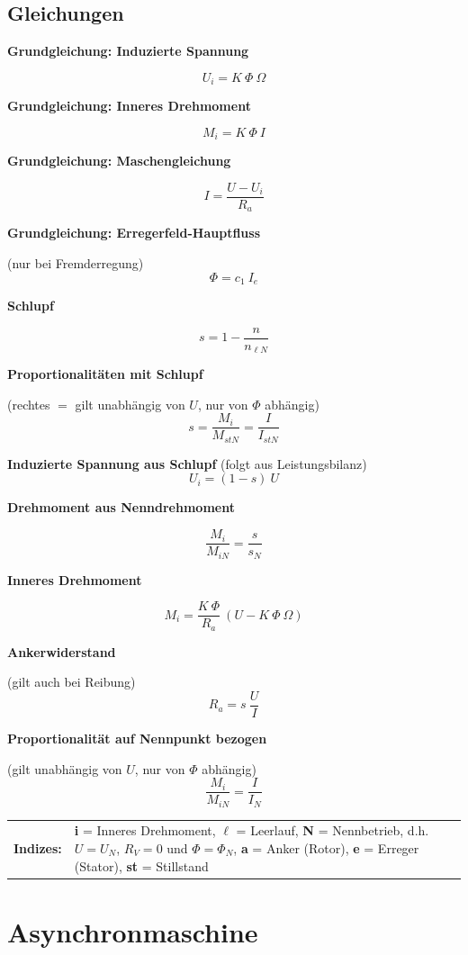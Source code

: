 \documentclass[11pt]{article}
\newcommand{\fancythumb}[2]{
	\addthumb{#1}{\large\sffamily\textbf{\space\space#1\vspace{5pt}}}{white}{#2}
}
\newcommand{\fancyformula}[2]{
	\small
	\raggedright\sffamily\textbf{#1}
	#2
}
\begin{document}
\subsection*{Gleichungen}
\begin{multicols}{2}
\fancyformula{Grundgleichung: Induzierte Spannung}{
	\[
		U_i = K ~ \Phi ~ \Omega
	\]
}

\fancyformula{Grundgleichung: Inneres Drehmoment}{
	\[
		M_i = K ~ \Phi ~ I
	\]
}

\fancyformula{Grundgleichung: Maschengleichung}{
	\[
		I = \frac{U - U_i}{R_a}
	\]
}

\fancyformula{Grundgleichung: Erregerfeld-Hauptfluss}{
	(nur bei Fremderregung)
	\[
		\Phi = c_1 ~ I_e
	\]
}

\fancyformula{Schlupf}{
	\[
		s = 1 - \frac{n}{n_{\ell N}}
	\]
}

\fancyformula{Proportionalitäten mit Schlupf}{
	(rechtes $=$ gilt unabhängig von $U$, nur von $\Phi$ abhängig)
	\[
		s = \frac{M_i}{M_{stN}} = \frac{I}{I_{stN}}
	\]
}

\fancyformula{Induzierte Spannung aus Schlupf}{(folgt aus Leistungsbilanz)
	\[
		U_i = (1 - s) ~ U
	\]
}

\fancyformula{Drehmoment aus Nenndrehmoment}{
	\[
		\frac{M_i}{M_{iN}} = \frac{s}{s_N}
	\]
}

\fancyformula{Inneres Drehmoment}{
	\[
		M_i = \frac{K ~ \Phi}{R_a} ~ (U - K ~ \Phi ~ \Omega)
	\]
}

\fancyformula{Ankerwiderstand}{
	(gilt auch bei Reibung)
	\[
		R_a = s ~ \frac{U}{I}
	\]
}

\fancyformula{Proportionalität auf Nennpunkt bezogen}{
	(gilt unabhängig von $U$, nur von $\Phi$ abhängig)
	\[
		\frac{M_i}{M_{iN}} = \frac{I}{I_N}
	\]
}
\end{multicols}

\raggedright
\vspace{12pt}
\footnotesize
\begin{tabular}{r p{13cm}}
	\sffamily\textbf{Indizes:} & \rmfamily \textbf{i} = Inneres Drehmoment, \textbf{$\ell$} = Leerlauf, \textbf{N} = Nennbetrieb, d.h. $U = U_N$, $R_V = 0$ und $\Phi = \Phi_N$, \textbf{a} = Anker (Rotor), \textbf{e} = Erreger (Stator), \textbf{st} = Stillstand
\end{tabular}
\normalsize


\newpage
\section*{Asynchronmaschine}
\fancythumb{ASM}{red}
\end{document}
